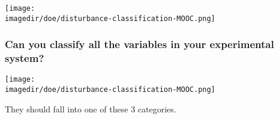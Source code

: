%
%
%
%
%
%
%
%

\begin{frame}\frametitle{}
	\begin{center}
		\texttt{[image: \\imagedir/doe/disturbance-classification-MOOC.png]}
	\end{center}
\end{frame}

\begin{frame}\frametitle{Can you classify all the variables in your experimental system?}
	\begin{center}
		\texttt{[image: \\imagedir/doe/disturbance-classification-MOOC.png]}
	\end{center}
	They should fall into one of these 3 categories.
\end{frame}

